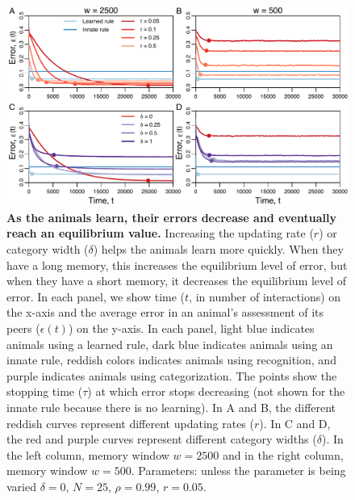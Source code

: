 \begin{figure}
\includegraphics[width=6.85in]{figures/speed_accuracy_tradeoff.pdf}
\caption{\sffamily\small\textbf{As the animals learn, their errors decrease and eventually reach an equilibrium value.} Increasing the updating rate ($r$) or category width ($\delta$) helps the animals learn more quickly. When they have a long memory, this increases the equilibrium level of error, but when they have a short memory, it decreases the equilibrium level of error. In each panel, we show time ($t$, in number of interactions) on the x-axis and the average error in an animal's assessment of its peers ($\epsilon(t)$) on the y-axis. In each panel, light blue indicates animals using a learned rule, dark blue indicates animals using an innate rule, reddish colors indicates animals using recognition, and purple indicates animals using categorization. The points show the stopping time ($\tau$) at which error stops decreasing (not shown for the innate rule because there is no learning). In A and B, the different reddish curves represent different updating rates ($r$). In C and D, the red and purple curves represent different category widths ($\delta$). In the left column, memory window $w=2500$ and in the right column, memory window $w=500$. Parameters: unless the parameter is being varied $\delta=0$, $N=25$, $\rho=0.99$, $r=0.05$.}
\label{tradeoff}
\end{figure}

